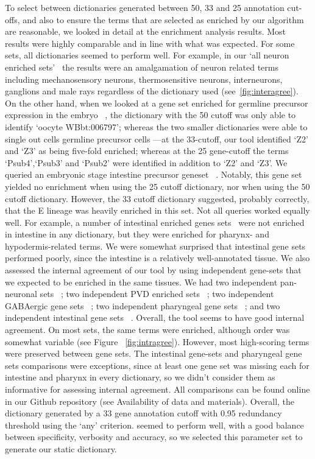\documentclass[linenumbers, doublespacing]{bmcart}
\begin{document}
To select between dictionaries generated between 50, 33 and 25 annotation cut-offs, and also to ensure the terms that are selected as enriched by our algorithm are reasonable, we looked in detail at the enrichment analysis results.
Most results were highly comparable and in line with what was expected. For some sets, all dictionaries seemed to perform well. For example, in our `all neuron enriched sets'~ \cite{Spencer2011, Watson2008a} the results were an amalgamation of neuron related terms including mechanosensory neurons, thermosensitive neurons, interneurons, ganglions and male rays regardless of the dictionary used (see~\ref{fig:interagree}). On the other hand, when we looked at a gene set enriched for germline precursor expression in the embryo~ \cite{Spencer2011}, the dictionary with the 50 cutoff was only able to identify `oocyte WBbt:006797'; whereas the two smaller dictionaries were able to single out cells germline precursor cells ---at the 33-cutoff, our tool identified `Z2' and `Z3' as being five-fold enriched; whereas at the 25 gene-cutoff the terms `Psub4',`Psub3' and `Psub2' were identified in addition to `Z2' and `Z3'.
We queried an embryonic stage intestine precursor geneset~ \cite{Spencer2011}. Notably, this gene set yielded no enrichment when using the 25 cutoff dictionary, nor when using the 50 cutoff dictionary. However, the 33 cutoff dictionary suggested, probably correctly, that the E lineage was heavily enriched in this set.
Not all queries worked equally well. For example, a number of intestinal enriched genes sets~ \cite{Spencer2011, Pauli2006} were not enriched in intestine in any dictionary, but they were enriched for pharynx- and hypodermis-related terms. We were somewhat surprised that intestinal gene sets performed poorly, since the intestine is a relatively well-annotated tissue.
We also assessed the internal agreement of our tool by using independent gene-sets that we expected to be enriched in the same tissues. We had two independent pan-neuronal sets~ \cite{Spencer2011, Watson2008a}; two independent PVD enriched sets~ \cite{Spencer2011, Smith2010}; two independent GABAergic gene sets~ \cite{Spencer2011, Cinar2005}; two independent pharyngeal gene sets~ \cite{Spencer2011, Gaudet2004a}; and two independent intestinal gene sets~ \cite{Spencer2011, Pauli2006}. Overall, the tool seems to have good internal agreement. On most sets, the same terms were enriched, although order was somewhat variable (see Figure ~\ref{fig:intragree}). However, most high-scoring terms were preserved between gene sets. The intestinal gene-sets and pharyngeal gene sets comparisons were exceptions, since at least one gene set was missing each for intestine and pharynx in every dictionary, so we didn't consider them as informative for assessing internal agreement.
 All comparisons can be found online in our Github repository (see Availability of data and materials). Overall, the dictionary generated by a 33 gene annotation cutoff with 0.95 redundancy threshold using the `any' criterion. seemed to perform well, with a good balance between specificity, verbosity and accuracy, so we selected this parameter set to generate our static dictionary.
\end{document}
